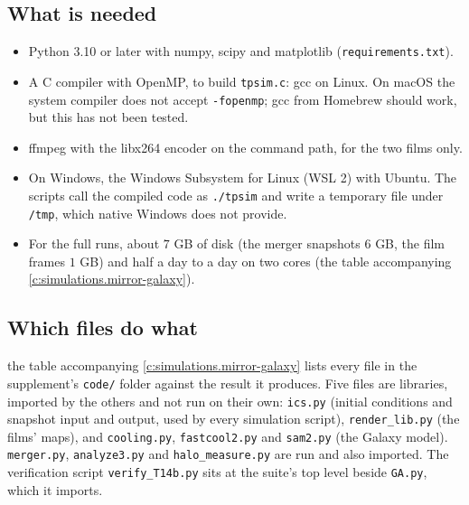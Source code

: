 \documentclass[11pt]{article}
\theoremstyle{definition}
\theoremstyle{plain}
\providecommand{\file}{}\renewcommand{\file}[1]{\texttt{#1}}
\begin{document}
\subsection*{What is needed}
\label{c:note.simulations.setting-what-needed}
\begin{itemize}
\item Python 3.10 or later with numpy, scipy and matplotlib (\file{requirements.txt}).
\item A C compiler with OpenMP, to build \file{tpsim.c}: gcc on Linux. On macOS the system compiler does not accept \texttt{-fopenmp}; gcc from Homebrew should work, but this has not been tested.
\item ffmpeg with the libx264 encoder on the command path, for the two films only.
\item On Windows, the Windows Subsystem for Linux (WSL 2) with Ubuntu. The scripts call the compiled code as \texttt{./tpsim} and write a temporary file under \texttt{/tmp}, which native Windows does not provide.
\item For the full runs, about $7$ GB of disk (the merger snapshots $6$ GB, the film frames $1$ GB) and half a day to a day on two cores (the table accompanying \ref{c:simulations.mirror-galaxy}).
\end{itemize}

\subsection*{Which files do what}
\label{c:note.simulations.setting-which-files-do-what}
the table accompanying \ref{c:simulations.mirror-galaxy} lists every file in the supplement's \file{code/} folder against the result it produces. Five files are libraries, imported by the others and not run on their own: \file{ics.py} (initial conditions and snapshot input and output, used by every simulation script), \file{render\_lib.py} (the films' maps), and \file{cooling.py}, \file{fastcool2.py} and \file{sam2.py} (the Galaxy model). \file{merger.py}, \file{analyze3.py} and \file{halo\_measure.py} are run and also imported. The verification script \file{verify\_T14b.py} sits at the suite's top level beside \file{GA.py}, which it imports.
\end{document}
